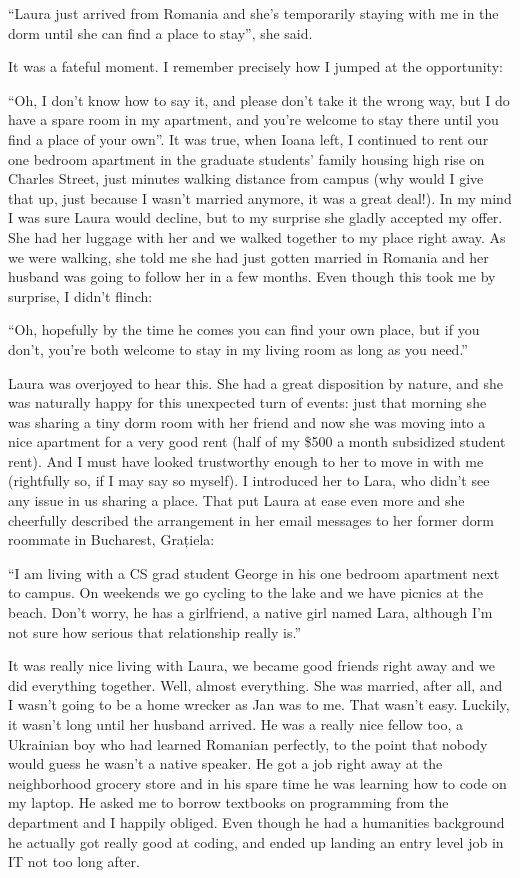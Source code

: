 \documentclass[12pt]{book}
\begin{document}
``Laura just arrived from Romania and she's temporarily staying with me
in the dorm until she can find a place to stay'', she said.

It was a fateful moment. I remember precisely how I jumped at the
opportunity:

``Oh, I don't know how to say it, and please don't take it the wrong
way, but I do have a spare room in my apartment, and you're welcome to
stay there until you find a place of your own''. It was true, when Ioana
left, I continued to rent our one bedroom apartment in the graduate
students' family housing high rise on Charles Street, just minutes
walking distance from campus (why would I give that up, just because I
wasn't married anymore, it was a great deal!). In my mind I was sure
Laura would decline, but to my surprise she gladly accepted my offer.
She had her luggage with her and we walked together to my place right
away. As we were walking, she told me she had just gotten married in
Romania and her husband was going to follow her in a few months. Even
though this took me by surprise, I didn't flinch:

``Oh, hopefully by the time he comes you can find your own place, but if
you don't, you're both welcome to stay in my living room as long as you
need.''

Laura was overjoyed to hear this. She had a great disposition by nature,
and she was naturally happy for this unexpected turn of events: just
that morning she was sharing a tiny dorm room with her friend and now
she was moving into a nice apartment for a very good rent (half of my
\$500 a month subsidized student rent). And I must have looked
trustworthy enough to her to move in with me (rightfully so, if I may
say so myself). I introduced her to Lara, who didn't see any issue in us
sharing a place. That put Laura at ease even more and she cheerfully
described the arrangement in her email messages to her former dorm
roommate in Bucharest, Grațiela:

``I am living with a CS grad student George in his one bedroom apartment
next to campus. On weekends we go cycling to the lake and we have
picnics at the beach. Don't worry, he has a girlfriend, a native girl
named Lara, although I'm not sure how serious that relationship really
is.''

It was really nice living with Laura, we became good friends right away
and we did everything together. Well, almost everything. She was
married, after all, and I wasn't going to be a home wrecker as Jan was
to me. That wasn't easy. Luckily, it wasn't long until her husband
arrived. He was a really nice fellow too, a Ukrainian boy who had
learned Romanian perfectly, to the point that nobody would guess he
wasn't a native speaker. He got a job right away at the neighborhood
grocery store and in his spare time he was learning how to code on my
laptop. He asked me to borrow textbooks on programming from the
department and I happily obliged. Even though he had a humanities
background he actually got really good at coding, and ended up landing
an entry level job in IT not too long after.
\end{document}
